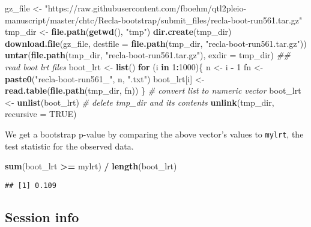 \documentclass[oneside]{book}
\newenvironment{Shaded}{\begin{snugshade}}{\end{snugshade}}
\newcommand{\CommentTok}[1]{\textcolor[rgb]{0.56,0.35,0.01}{\textit{#1}}}
\newcommand{\ControlFlowTok}[1]{\textcolor[rgb]{0.13,0.29,0.53}{\textbf{#1}}}
\newcommand{\DataTypeTok}[1]{\textcolor[rgb]{0.13,0.29,0.53}{#1}}
\newcommand{\DecValTok}[1]{\textcolor[rgb]{0.00,0.00,0.81}{#1}}
\newcommand{\KeywordTok}[1]{\textcolor[rgb]{0.13,0.29,0.53}{\textbf{#1}}}
\newcommand{\NormalTok}[1]{#1}
\newcommand{\OperatorTok}[1]{\textcolor[rgb]{0.81,0.36,0.00}{\textbf{#1}}}
\newcommand{\OtherTok}[1]{\textcolor[rgb]{0.56,0.35,0.01}{#1}}
\newcommand{\StringTok}[1]{\textcolor[rgb]{0.31,0.60,0.02}{#1}}
\begin{document}
\begin{Shaded}
\begin{Highlighting}[]
\NormalTok{gz_file <-}\StringTok{ "https://raw.githubusercontent.com/fboehm/qtl2pleio-manuscript/master/chtc/Recla-bootstrap/submit_files/recla-boot-run561.tar.gz"}
\NormalTok{tmp_dir <-}\StringTok{ }\KeywordTok{file.path}\NormalTok{(}\KeywordTok{getwd}\NormalTok{(), }\StringTok{"tmp"}\NormalTok{)}
\KeywordTok{dir.create}\NormalTok{(tmp_dir)}
\KeywordTok{download.file}\NormalTok{(gz_file, }\DataTypeTok{destfile =} \KeywordTok{file.path}\NormalTok{(tmp_dir, }\StringTok{"recla-boot-run561.tar.gz"}\NormalTok{))}
\KeywordTok{untar}\NormalTok{(}\KeywordTok{file.path}\NormalTok{(tmp_dir, }\StringTok{"recla-boot-run561.tar.gz"}\NormalTok{), }\DataTypeTok{exdir =}\NormalTok{ tmp_dir)}
\CommentTok{## read boot lrt files}
\NormalTok{boot_lrt <-}\StringTok{ }\KeywordTok{list}\NormalTok{()}
\ControlFlowTok{for}\NormalTok{ (i }\ControlFlowTok{in} \DecValTok{1}\OperatorTok{:}\DecValTok{1000}\NormalTok{)\{}
\NormalTok{  n <-}\StringTok{ }\NormalTok{i }\OperatorTok{-}\StringTok{ }\DecValTok{1}
\NormalTok{  fn <-}\StringTok{ }\KeywordTok{paste0}\NormalTok{(}\StringTok{"recla-boot-run561_"}\NormalTok{, n, }\StringTok{".txt"}\NormalTok{)}
\NormalTok{  boot_lrt[i] <-}\StringTok{ }\KeywordTok{read.table}\NormalTok{(}\KeywordTok{file.path}\NormalTok{(tmp_dir, fn))}
\NormalTok{\}}
\CommentTok{# convert list to numeric vector}
\NormalTok{boot_lrt <-}\StringTok{ }\KeywordTok{unlist}\NormalTok{(boot_lrt)}
\CommentTok{# delete tmp_dir and its contents}
\KeywordTok{unlink}\NormalTok{(tmp_dir, }\DataTypeTok{recursive =} \OtherTok{TRUE}\NormalTok{)}
\end{Highlighting}
\end{Shaded}

We get a bootstrap p-value by comparing the above vector's values to
\texttt{mylrt}, the test statistic for the observed data.

\begin{Shaded}
\begin{Highlighting}[]
\KeywordTok{sum}\NormalTok{(boot_lrt }\OperatorTok{>=}\StringTok{ }\NormalTok{mylrt) }\OperatorTok{/}\StringTok{ }\KeywordTok{length}\NormalTok{(boot_lrt)}
\end{Highlighting}
\end{Shaded}

\begin{verbatim}
## [1] 0.109
\end{verbatim}

\hypertarget{session-info}{%
\subsection{Session info}\label{session-info}}
\end{document}
